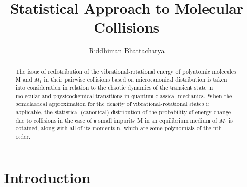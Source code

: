 \documentclass{article}
\title{\Huge \textbf{Statistical Approach to
Molecular Collisions}}
\author{Riddhiman Bhattacharya}
\begin{document}
\maketitle

\begin{abstract}
\large 

The issue of redistribution of the vibrational-rotational energy of polyatomic molecules M and $M_1$ in their pairwise collisions based on microcanonical distribution is taken into consideration in relation to the chaotic dynamics of the transient state in molecular and physicochemical transitions in quantum-classical mechanics. When the semiclassical approximation for the density of vibrational-rotational states is applicable, the statistical (canonical) distribution of the probability of energy change due to collisions in the case of a small impurity M in an equilibrium medium of $M_1$ is obtained, along with all of its moments n, which are some polynomials of the nth order.
\end{abstract}
\Large


\section{\Large Introduction}
\end{document}

